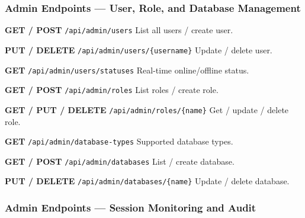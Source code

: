 \subsubsection{Admin Endpoints — User, Role, and Database Management}

\begin{tcolorbox}[colback=orange!5, colframe=orange!50, title=\textbf{User and Role Administration}]

\textbf{GET / POST} \texttt{/api/admin/users} \quad List all users / create user.

\vspace{0.2cm}

\textbf{PUT / DELETE} \texttt{/api/admin/users/\{username\}} \quad Update / delete user.

\vspace{0.2cm}

\textbf{GET} \texttt{/api/admin/users/statuses} \quad Real-time online/offline status.

\vspace{0.2cm}

\textbf{GET / POST} \texttt{/api/admin/roles} \quad List roles / create role.

\vspace{0.2cm}

\textbf{GET / PUT / DELETE} \texttt{/api/admin/roles/\{name\}} \quad Get / update / delete role.

\vspace{0.2cm}

\textbf{GET} \texttt{/api/admin/database-types} \quad Supported database types.

\vspace{0.2cm}

\textbf{GET / POST} \texttt{/api/admin/databases} \quad List / create database.

\vspace{0.2cm}

\textbf{PUT / DELETE} \texttt{/api/admin/databases/\{name\}} \quad Update / delete database.

\end{tcolorbox}

\subsubsection{Admin Endpoints — Session Monitoring and Audit}

